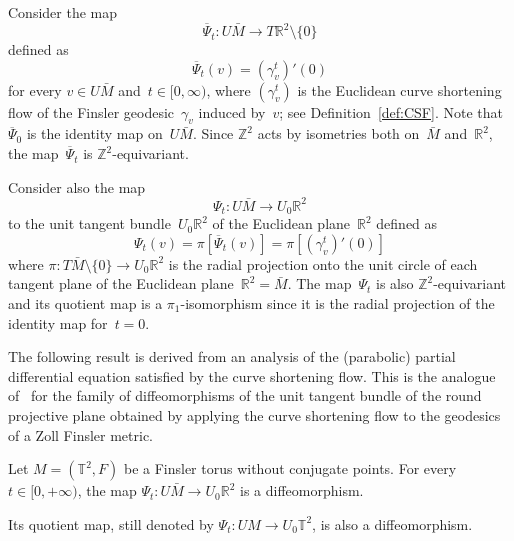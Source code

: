 \documentclass[AHL,Unicode,longabstracts,published]{cedram}
\newcommand{\Z}{\mathbb{Z}}
\newcommand{\R}{\mathbb{R}}
\newcommand{\T}{\mathbb{T}}
\begin{document}
\begin{defi}\label{def:Psi}
Consider the map
\[
\overline{\Psi}_t:U \bar{M} \to T \R^2 \setminus \{0\}
\]
defined as
\[
\overline{\Psi}_t(v) = (\gamma_v^t)'(0)
\]
for every $v \in U \bar{M}$ and~$t \in [0,\infty)$, where $(\gamma_v^t)$ is the Euclidean curve shortening flow of the Finsler geodesic~$\gamma_v$ induced by~$v$; see Definition~\ref{def:CSF}. Note that $\overline{\Psi}_0$ is the identity map on~$U \bar{M}$. Since $\Z^2$ acts by isometries both on~$\bar{M}$ and~$\R^2$, the map~$\overline{\Psi}_t$ is $\Z^2$-equivariant.

Consider also the map
\[
\Psi_t:U\bar{M} \to U_0 \R^2
\]
to the unit tangent bundle~$U_0\R^2$ of the Euclidean plane~$\R^2$ defined as
\[
\Psi_t(v) = \pi\left[\overline{\Psi}_t(v)\right] = \pi\left[(\gamma_v^t)'(0)\right]
\]
where $\pi:T\bar{M} \setminus \{0\} \to U_0 \R^2$ is the radial projection onto the unit circle of each tangent plane of the Euclidean plane~$\R^2 = \bar{M}$. The map~$\Psi_t$ is also $\Z^2$-equivariant and its quotient map is a $\pi_1$-isomorphism since it is the radial projection of the identity map for~$t=0$.
\end{defi}

The following result is derived from an analysis of the (parabolic) partial differential equation satisfied by the curve shortening flow. This is the analogue of~\cite[Proposition~4.4]{Sa19} for the family of diffeomorphisms of the unit tangent bundle of the round projective plane obtained by applying the curve shortening flow to the geodesics of a Zoll Finsler metric.


\begin{theo}\label{theo:Psi}
Let $M=(\T^2,F)$ be a Finsler torus without conjugate points. For every $t \in [0,+\infty)$, the map $\Psi_t:U\bar{M} \to U_0\R^2$ is a diffeomorphism.

Its quotient map, still denoted by $\Psi_t:UM \to U_0\T^2$, is also a diffeomorphism.
\end{theo}
\end{document}
